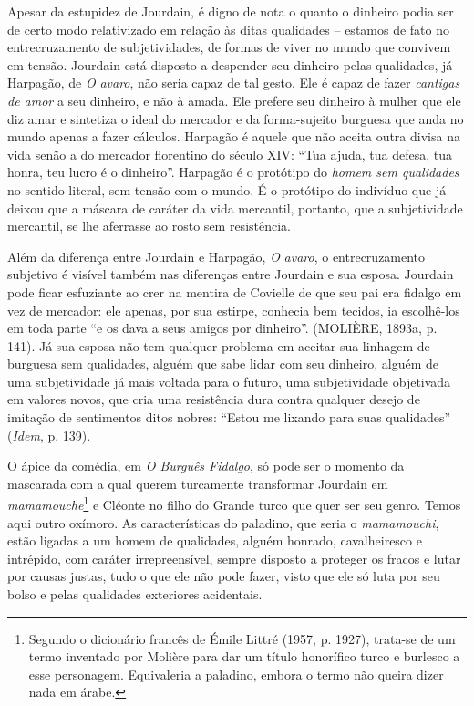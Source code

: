 Apesar da estupidez de Jourdain, é digno de nota o quanto o dinheiro
podia ser de certo modo relativizado em relação às ditas qualidades --
estamos de fato no entrecruzamento de subjetividades, de formas de viver
no mundo que convivem em tensão. Jourdain está disposto a despender seu
dinheiro pelas qualidades, já Harpagão, de \emph{O} \emph{avaro}, não
seria capaz de tal gesto. Ele é capaz de fazer \emph{cantigas de amor} a
seu dinheiro, e não à amada. Ele prefere seu dinheiro à mulher que ele
diz amar e sintetiza o ideal do mercador e da forma-sujeito burguesa que
anda no mundo apenas a fazer cálculos. Harpagão é aquele que não aceita
outra divisa na vida senão a do mercador florentino do século XIV: ``Tua
ajuda, tua defesa, tua honra, teu lucro é o dinheiro''. Harpagão é o
protótipo do \emph{homem sem qualidades} no sentido literal, sem tensão
com o mundo. É o protótipo do indivíduo que já deixou que a máscara de
caráter da vida mercantil, portanto, que a subjetividade mercantil, se
lhe aferrasse ao rosto sem resistência.

Além da diferença entre Jourdain e Harpagão, \emph{O} \emph{avaro}, o
entrecruzamento subjetivo é visível também nas diferenças entre Jourdain
e sua esposa. Jourdain pode ficar esfuziante ao crer na mentira de
Covielle de que seu pai era fidalgo em vez de mercador: ele apenas, por
sua estirpe, conhecia bem tecidos, ia escolhê-los em toda parte ``e os
dava a seus amigos por dinheiro''. (MOLIÈRE, 1893a, p. 141). Já sua
esposa não tem qualquer problema em aceitar sua linhagem de burguesa sem
qualidades, alguém que sabe lidar com seu dinheiro, alguém de uma
subjetividade já mais voltada para o futuro, uma subjetividade
objetivada em valores novos, que cria uma resistência dura contra
qualquer desejo de imitação de sentimentos ditos nobres: ``Estou me
lixando para suas qualidades'' (\emph{Idem}, p. 139).

O ápice da comédia, em \emph{O Burguês Fidalgo}, só pode ser o momento
da mascarada com a qual querem turcamente transformar Jourdain em
\emph{mamamouche}\footnote{Segundo o dicionário francês de Émile Littré
  (1957, p. 1927), trata-se de um termo inventado por Molière para dar
  um título honorífico turco e burlesco a esse personagem. Equivaleria a
  paladino, embora o termo não queira dizer nada em árabe.} e Cléonte no
filho do Grande turco que quer ser seu genro. Temos aqui outro oxímoro.
As características do paladino, que seria o \emph{mamamouchi}, estão
ligadas a um homem de qualidades, alguém honrado, cavalheiresco e
intrépido, com caráter irrepreensível, sempre disposto a proteger os
fracos e lutar por causas justas, tudo o que ele não pode fazer, visto
que ele só luta por seu bolso e pelas qualidades exteriores acidentais.

